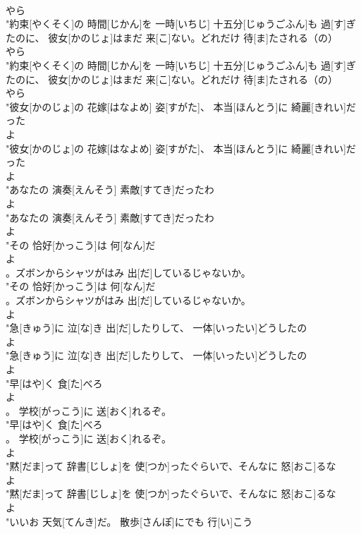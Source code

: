 \documentclass[8pt]{extreport}
\begin{document}
\begin{CJK}{UTF8}{min}
\\	やら
\\	"約束[やくそく]の 時間[じかん]を 一時[いちじ] 十五分[じゅうごふん]も 過[す]ぎたのに、 彼女[かのじょ]はまだ 来[こ]ない。どれだけ 待[ま]たされる（の）
\\	やら
\\	"約束[やくそく]の 時間[じかん]を 一時[いちじ] 十五分[じゅうごふん]も 過[す]ぎたのに、 彼女[かのじょ]はまだ 来[こ]ない。どれだけ 待[ま]たされる（の）
\\	やら
\\	"彼女[かのじょ]の 花嫁[はなよめ] 姿[すがた]、 本当[ほんとう]に 綺麗[きれい]だった
\\	よ
\\	"彼女[かのじょ]の 花嫁[はなよめ] 姿[すがた]、 本当[ほんとう]に 綺麗[きれい]だった
\\	よ
\\	"あなたの 演奏[えんそう] 素敵[すてき]だったわ
\\	よ
\\	"あなたの 演奏[えんそう] 素敵[すてき]だったわ
\\	よ
\\	"その 恰好[かっこう]は 何[なん]だ
\\	よ
\\	。ズボンからシャツがはみ 出[だ]しているじゃないか。
\\	"その 恰好[かっこう]は 何[なん]だ
\\	。ズボンからシャツがはみ 出[だ]しているじゃないか。
\\	よ
\\	"急[きゅう]に 泣[な]き 出[だ]したりして、 一体[いったい]どうしたの
\\	よ
\\	"急[きゅう]に 泣[な]き 出[だ]したりして、 一体[いったい]どうしたの
\\	よ
\\	"早[はや]く 食[た]べろ
\\	よ
\\	。 学校[がっこう]に 送[おく]れるぞ。
\\	"早[はや]く 食[た]べろ
\\	。 学校[がっこう]に 送[おく]れるぞ。
\\	よ
\\	"黙[だま]って 辞書[じしょ]を 使[つか]ったぐらいで、そんなに 怒[おこ]るな
\\	よ
\\	"黙[だま]って 辞書[じしょ]を 使[つか]ったぐらいで、そんなに 怒[おこ]るな
\\	よ
\\	"いいお 天気[てんき]だ。 散歩[さんぽ]にでも 行[い]こう

\end{CJK}
\end{document}
